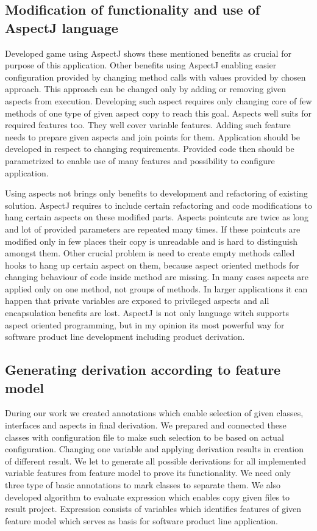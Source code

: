 \documentclass[11pt,slovak,a4paper,twoside]{article}
\begin{document}
\subsection{Modification of functionality and use of AspectJ language} \label{functionalityModiffication}

Developed game using AspectJ shows these mentioned benefits as crucial for purpose of this application. Other benefits using AspectJ enabling easier configuration provided by changing method calls with values provided by chosen approach. This approach can be changed only by adding or removing given aspects from execution. Developing such aspect requires only changing core of few methods of one type of given aspect copy to reach this goal. Aspects well suits for required features too. They well cover variable features. Adding such feature needs to prepare given aspects and join points for them. Application should be developed in respect to changing requirements. Provided code then should be parametrized to enable use of many features and possibility to configure application.

Using aspects not brings only benefits to development and refactoring of existing solution. AspectJ requires to include certain refactoring and code modifications to hang certain aspects on these modified parts. Aspects pointcuts are twice as long and lot of provided parameters are repeated many times. If these pointcuts are modified only in few places their copy is unreadable and is hard to distinguish amongst them. Other crucial problem is need to create empty methods called hooks to hang up certain aspect on them, because aspect oriented methods for changing behaviour of code inside method are missing. In many cases aspects are applied only on one method, not groups of methods. In larger applications it can happen that private variables are exposed to privileged aspects and all encapsulation benefits are lost. AspectJ is not only language witch supports aspect oriented programming, but in my opinion its most powerful way for software product line development including product derivation.


\subsection{Generating derivation according to feature model} \label{gameDerivationBattleship}

During our work we created annotations which enable selection of given classes, interfaces and aspects in final derivation. We prepared and connected these classes with configuration file to make such selection to be based on actual configuration. Changing one variable and applying derivation results in creation of different result. We let to generate all possible derivations for all implemented variable features from feature model to prove its functionality. We need only three type of basic annotations to mark classes to separate them. We also developed algorithm to evaluate expression which enables copy given files to result project. Expression consists of variables which identifies features of given feature model which serves as basis for software product line application.    
\end{document}
